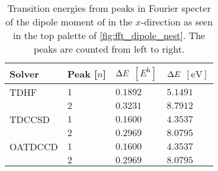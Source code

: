         \begin{table}
            \centering
            \caption{Transition energies from peaks in Fourier specter of the
            dipole moment of  in the $x$-direction as seen in the top
            palette of \autoref{fig:fft_dipole_nest}.
            The peaks are counted from left to right.}
            \renewcommand{\arraystretch}{1.3}
            \begin{tabular}{@{}llll@{}}
                \toprule
                Solver & Peak [$n$] & $\Delta E$ $[\si{\hartree}]$
                & $\Delta E$ $[\si{\electronvolt}]$ \\
                \midrule
                TDHF & $1$ & $0.1892$ & $5.1491$ \\
                & $2$ & $0.3231$ & $8.7912$ \\
                TDCCSD & $1$ & $0.1600$ & $4.3537$ \\
                & $2$ & $0.2969$ & $8.0795$ \\
                OATDCCD & $1$ & $0.1600$ & $4.3537$ \\
                & $2$ & $0.2969$ & $8.0795$ \\
                \bottomrule
            \end{tabular}
            \label{tab:fft_dipole_nest_x}
        \end{table}

